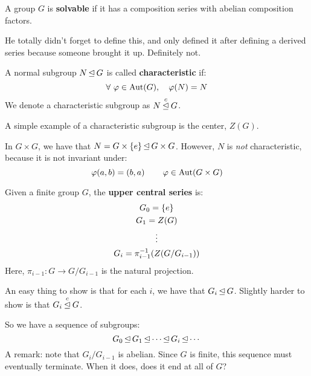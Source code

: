 
\begin{defn}
    A group $ G $ is \textbf{solvable} if it has a composition series with abelian composition
    factors.
\end{defn}
He totally didn't forget to define this, and only defined it after defining a derived series
because someone brought it up. Definitely not.

\begin{defn}
    A normal subgroup $ N \operatorname{\trianglelefteq} G $ is called \textbf{characteristic} if:
    \begin{equation*}
        \forall \, \operatorname{\varphi} \in \operatorname{Aut}(G), \quad \operatorname{\varphi}(N) = N
    \end{equation*}
    We denote a characteristic subgroup as $ N \: \overset{c}{\operatorname{\trianglelefteq}} \: G $.
\end{defn}

A simple example of a characteristic subgroup is the center, $ Z(G) $.

\begin{xmp}[source=Primary Source Material]
    In $ G \times G $, we have that $ N = G \times \left\{{e}\right\} \operatorname{\trianglelefteq} G \times G $.
    However, $ N $ is \textit{not} characteristic, because it is not invariant
    under:
    \begin{equation*}
        \operatorname{\varphi}(a, b) = (b, a) \qquad \operatorname{\varphi} \in \operatorname{Aut}(G \times G)
    \end{equation*}
\end{xmp}

\begin{defn}
    Given a finite group $ G $, the \textbf{upper central series} is:
    \begin{gather*}
        G_{0} = \left\{{e}\right\} \\
        G_{1} = Z(G) \\
        \vdots \\
        G_{i} = \pi_{i-1}^{-1}(Z(G/G_{i-1}))
    \end{gather*}
    Here, $ \pi_{i-1} : G \rightarrow G/G_{i-1} $ is the natural projection.
\end{defn}

An easy thing to show is that for each $ i $, we have that $ G_{i} \operatorname{\trianglelefteq} G $.
Slightly harder to show is that $ G_{i} \: \overset{c}{\operatorname{\trianglelefteq}} \: G $.

So we have a sequence of subgroups:
\begin{equation*}
    G_{0} \operatorname{\trianglelefteq} G_{1} \operatorname{\trianglelefteq} \cdots \operatorname{\trianglelefteq} G_{i} \operatorname{\trianglelefteq} \cdots
\end{equation*}
A remark: note that $ G_{i}/G_{i-1} $ is abelian.
Since $ G $ is finite, this sequence must eventually terminate.
When it does, does it end at all of $ G $?

